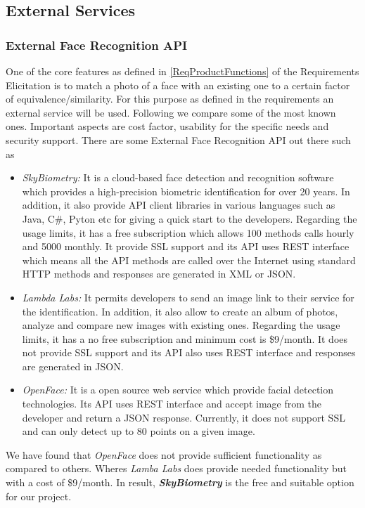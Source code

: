 \documentclass[a4paper,11pt]{article}
\begin{document}
\subsection{External Services}

\subsubsection{External Face Recognition API}
One of the core features as defined in \ref{ReqProductFunctions} of the Requirements Elicitation is to match a photo of a face with an existing one to a certain factor of equivalence/similarity. For this purpose as defined in the requirements an external service will be used. Following we compare some of the most known ones. Important aspects are cost factor, usability for the specific needs and security support.
There are some External Face Recognition API out there such as
\begin{itemize}
\item \emph{SkyBiometry: } It is a cloud-based face detection and recognition software which provides a high-precision biometric identification for over 20 years. In addition, it also provide API client libraries in various languages such as Java, C\#, Pyton etc for giving a quick start to the developers. Regarding the usage limits, it has a free subscription which allows 100 methods calls hourly and 5000 monthly. It provide SSL support and its API uses REST interface which means all the API methods are called over the Internet using standard HTTP methods and responses are generated in XML or JSON.
\item \emph{Lambda Labs: } It permits developers to send an image link to their service for the identification. In addition, it also allow to create an album of photos, analyze and compare new images with existing ones. Regarding the usage limits, it has a no free subscription and minimum cost is \$9/month. It does not provide SSL support and its API also uses REST interface and responses are generated in JSON.
\item \emph{OpenFace: } It is a open source web service which provide facial detection technologies. Its API uses REST interface and accept image from the developer and return a JSON response. Currently, it does not support SSL and can only detect up to 80 points on a given image.
\end{itemize}
We have found that \emph{OpenFace} does not provide sufficient functionality as compared to others. Wheres \emph{Lamba Labs} does provide needed functionality but with a cost of \$9/month. In result, \emph{\textbf{SkyBiometry}} is the free and suitable option for our project.
\end{document}
